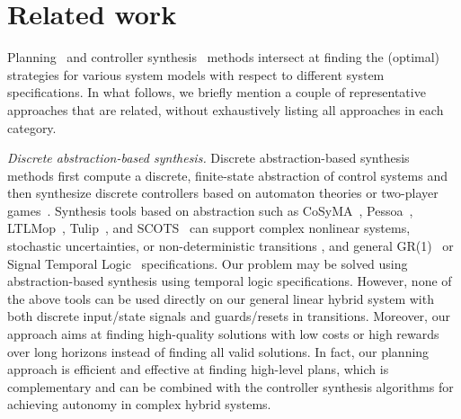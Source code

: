 \documentclass[sigconf]{acmart}
\begin{document}

\section{Related work}\label{section:related}

Planning~\cite{li2008generative,della2012universal,bryce2016happening,fernandez2018scottyactivity,cashmore2016compilation,bit2019cyber} and controller synthesis~\cite{LTLMOP,paulobook,Girard12,MajumdarMS16,KloetzerB08,Tulip-short,KloetzerB08,WongpiromsarnTM12,TabuadaP06,fan2018controller,raman2015reactive,herbert2017fastrack,vaskov2019towards} methods intersect at finding the (optimal) strategies for various system models with respect to different system specifications. In what follows, we briefly mention a couple of representative approaches that are related, without exhaustively listing all approaches in each category. 

\textit{Discrete abstraction-based synthesis.}
Discrete abstraction-based synthesis methods first compute a discrete, finite-state abstraction of control systems and then synthesize discrete controllers based on automaton theories or two-player games~\cite{paulobook,Girard12,MajumdarMS16,KloetzerB08,Tulip-short,KloetzerB08,WongpiromsarnTM12}. Synthesis tools based on abstraction such as 
CoSyMA~\cite{Cosyma},
Pessoa~\cite{pessoa}, LTLMop~\cite{LTLMOP,LTLMOP2},
Tulip~\cite{Tulip-short,FilippidisDLOM16}, and SCOTS~\cite{rungger2016scots} can support complex nonlinear systems, stochastic uncertainties, or non-deterministic transitions \cite{rungger2016scots,wongpiromsarn2011tulip,filippidis2016control,vidal2001decidable,plaku2013falsification,laurenti2020formal}, and general GR(1)~\cite{wongpiromsarn2011tulip} or Signal Temporal Logic~\cite{raman2015reactive} specifications. Our problem may be solved using abstraction-based synthesis using temporal logic specifications. However, none of the above tools can be used directly on our general linear hybrid system with both discrete input/state signals and guards/resets in transitions. Moreover, our approach aims at finding high-quality solutions with low costs or high rewards over long horizons instead of finding all valid solutions. In fact, our planning approach is efficient and effective at finding high-level plans, which is complementary and can be combined with the controller synthesis algorithms for achieving autonomy in  complex hybrid systems. 
\end{document}
